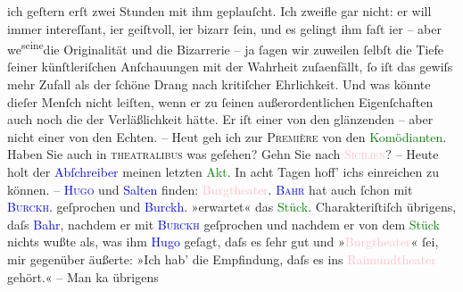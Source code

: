                ich geſtern erſt zwei Stunden mit ihm geplauſcht. Ich zweifle gar nicht: er will
               immer intereſſant, i{\geminationm}er geiſtvoll, i{\geminationm}er bizarr ſein, und es gelingt ihm faſt i{\geminationm}er – aber we{\geminationn}\substVorne{}\textsuperscript{seine}\substDazwischen{}die\substHinten{} Originalität {\pb}und die Bizarrerie – ja ſagen
               wir zuweilen ſelbſt die Tiefe ſeiner künſtleriſchen Anſchauungen mit der Wahrheit
                  zuſa{\geminationm}enfällt, ſo iſt das gewiſs mehr Zufall als der
               ſchöne Drang nach kritiſcher Ehrlichkeit. Und was könnte dieſer Menſch nicht {\pb}leiſten, wenn er zu ſeinen außerordentlichen
               Eigenſchaften auch noch die der Verläßlichkeit hätte. Er iſt einer von den glänzenden
               – aber nicht einer von den Echten. –\pend
           \pstart
           Heut geh ich zur \textsc{Première} von den \textcolor{green}{Komödianten}{}\ledrightnote{\textcolor{green}{Comödianten}}. Haben Sie auch in \textsc{theatralibus} was {\pb}geſehen? Gehn Sie nach \textcolor{pink}{\textsc{Sicilien}}{}\ledrightnote{\textcolor{pink}{Sizilien}}? –\pend
           \pstart
           Heute holt der \textcolor{blue}{Abſchreiber}{}
               meinen letzten \textcolor{green}{Akt}{}. In acht Tagen
               hoff’ ichs einreichen zu können. – \textcolor{blue}{\textsc{Hugo}}{}\ledrightnote{\textcolor{blue}{Hugo von Hofmannsthal}} und \textcolor{blue}{Salten}{}\ledrightnote{\textcolor{blue}{Felix Salten}} finden: \textcolor{pink}{Burgtheater}{}\ledrightnote{\textcolor{pink}{Burgtheater}}. \textcolor{blue}{\textsc{Bahr}}{}\ledrightnote{\textcolor{blue}{Hermann Bahr}} hat auch ſchon mit \textcolor{blue}{\textsc{Burckh}}{}\ledrightnote{\textcolor{blue}{Max Eugen Burckhard}}. geſprochen und \textcolor{blue}{Burckh}{}\ledrightnote{\textcolor{blue}{Max Eugen Burckhard}}. {\pb}»erwartet« das \textcolor{green}{Stück}{}. Charakteriſtiſch übrigens, daſs \textcolor{blue}{Bahr}{}\ledrightnote{\textcolor{blue}{Hermann Bahr}}, nachdem er mit \textcolor{blue}{\textsc{Burckh}}{}\ledrightnote{\textcolor{blue}{Max Eugen Burckhard}} geſprochen und nachdem er von dem \textcolor{green}{Stück}{} nichts wußte als, was ihm \textcolor{blue}{Hugo}{}\ledrightnote{\textcolor{blue}{Hugo von Hofmannsthal}} geſagt, daſs es ſehr gut und »\textcolor{pink}{Burgtheater}{}\ledrightnote{\textcolor{pink}{Burgtheater}}« ſei, mir gegenüber äußerte: {\pb}»Ich hab’ die Empfindung, daſs es ins \textcolor{pink}{Raimundtheater}{}\ledrightnote{\textcolor{pink}{Raimund-Theater}} gehört.« – Man ka{\geminationn} übrigens
